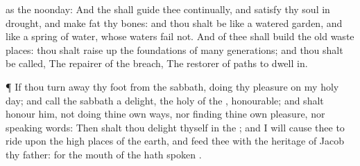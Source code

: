 {{} as the
noonday:
And the
{} shall
guide thee
continually, and
satisfy thy
soul in
drought, and make
fat thy
bones: and thou shalt be like a
watered
garden, and like a
spring of
water, whose
waters
fail not.
And
{} of thee shall
build the
old waste
places: thou shalt raise
up the
foundations of
many
generations; and thou shalt be
called, The
repairer of the
breach, The
restorer of
paths to dwell
in.
\par }{\PP {}¶ If thou turn
away thy
foot from the
sabbath,
{}
doing thy
pleasure on my
holy
day; and
call the
sabbath a
delight, the
holy of the
{},
honourable; and shalt
honour him, not
doing thine own
ways, nor
finding thine own
pleasure, nor
speaking
{}
words:
Then shalt thou
delight thyself in the
{}; and I will cause thee to
ride upon the high
places of the
earth, and
feed thee with the
heritage of
Jacob thy
father: for the
mouth of the
{} hath
spoken
{}.

}
